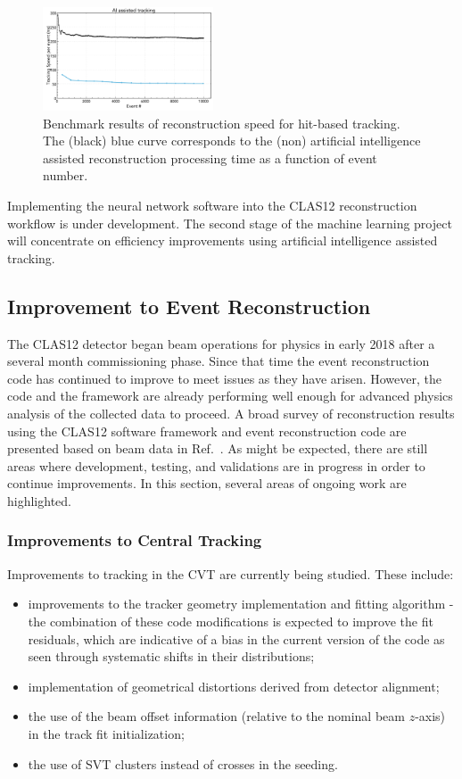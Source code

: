 \begin{figure}
\centering
\includegraphics[width=0.45\textwidth]{pics/nn2.png}
\caption{Benchmark results of reconstruction speed for hit-based tracking. The (black) blue curve corresponds to
  the (non) artificial intelligence assisted reconstruction processing time as a function of event number.}
\label{fig:nn2}
\end{figure}

Implementing the neural network software into the CLAS12 reconstruction workflow is under development.
The second stage of the machine learning project will concentrate on efficiency improvements using artificial
intelligence assisted tracking.

\subsection{Improvement to Event Reconstruction}

The CLAS12 detector began beam operations for physics in early 2018 after a several month commissioning
phase. Since that time the event reconstruction code has continued to improve to meet issues as they have
arisen. However, the code and the framework are already performing well enough for advanced physics
analysis of the collected data to proceed. A broad survey of reconstruction results using the CLAS12
software framework and event reconstruction code are presented based on beam data in Ref.~\cite{clas12-nim}.
As might be expected, there are still areas where development, testing, and validations are in progress in
order to continue improvements. In this section, several areas of ongoing work are highlighted.

\subsubsection{Improvements to Central Tracking}

Improvements to tracking in the CVT are currently being studied. These include:

\begin{itemize}
\item improvements to the tracker geometry implementation and fitting algorithm - the combination of these
  code modifications is expected to improve the fit residuals, which are indicative of a bias in the current
  version of the code as seen through systematic shifts in their distributions;
\item implementation of geometrical distortions derived from detector alignment;
\item the use of the beam offset information (relative to the nominal beam $z$-axis) in the track fit initialization;
\item the use of SVT clusters instead of crosses in the seeding.
\end{itemize}

